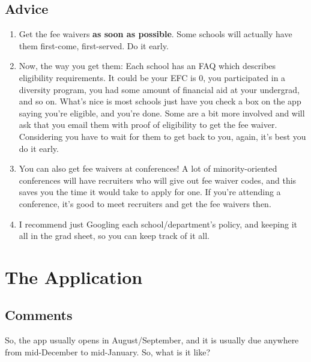 \documentclass[12pt]{article}
\begin{document}
\subsection{Advice}
\begin{enumerate}
\item Get the fee waivers \textbf{as soon as possible}. Some schools will actually have them first-come, first-served. Do it early.

\item Now, the way you get them: Each school has an FAQ which describes eligibility requirements. It could be your EFC is 0, you participated in a diversity program, you had some amount of financial aid at your undergrad, and so on. What’s nice is most schools just have you check a box on the app saying you’re eligible, and you’re done. Some are a bit more involved and will ask that you email them with proof of eligibility to get the fee waiver. Considering you have to wait for them to get back to you, again, it’s best you do it early.

\item You can also get fee waivers at conferences! A lot of minority-oriented conferences will have recruiters who will give out fee waiver codes, and this saves you the time it would take to apply for one. If you're attending a conference, it's good to meet recruiters and get the fee waivers then.

\item I recommend just Googling each school/department’s policy, and keeping it all in the grad sheet, so you can keep track of it all.
\end{enumerate}

\section{The Application}
\subsection{Comments}

So, the app usually opens in August/September, and it is usually due anywhere from mid-December to mid-January. So, what is it like?
\end{document}
